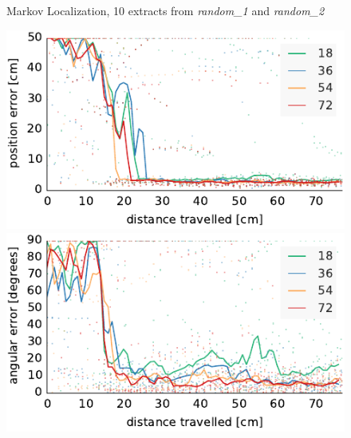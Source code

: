 \documentclass[letterpaper, 10pt, conference]{ieeeconf}
\begin{document}
\begin{figure}

\begin{center}
Markov Localization, 10 extracts from \emph{random\_1} and \emph{random\_2}
\end{center}
\includegraphics{ml-small_runs_random_12-xy}\hfill
\includegraphics{ml-small_runs_random_12-theta}

\vspace{.5em}


\end{figure}
\end{document}
